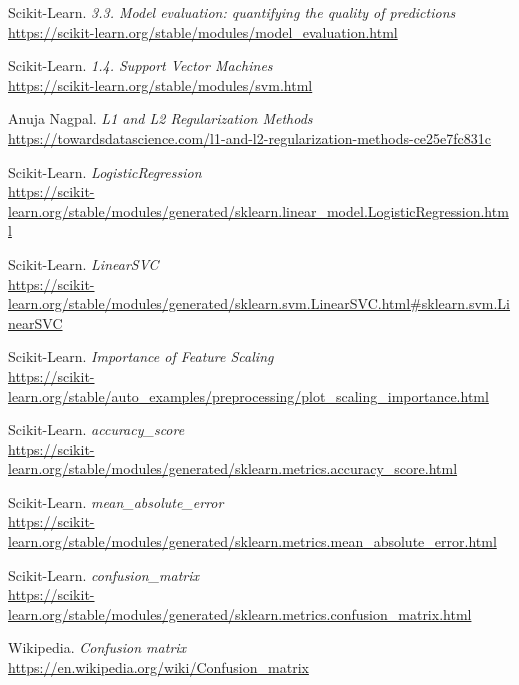 \documentclass[11pt,a4paper]{article}
\begin{document}
\begin{thebibliography}{22}
Scikit-Learn. \textit{3.3. Model evaluation: quantifying the quality of predictions}
\\\url{https://scikit-learn.org/stable/modules/model_evaluation.html}

Scikit-Learn. \textit{1.4. Support Vector Machines}
\\\url{https://scikit-learn.org/stable/modules/svm.html}

Anuja Nagpal. \textit{L1 and L2 Regularization Methods}
\\\url{https://towardsdatascience.com/l1-and-l2-regularization-methods-ce25e7fc831c}

Scikit-Learn. \textit{LogisticRegression}
\\\url{https://scikit-learn.org/stable/modules/generated/sklearn.linear_model.LogisticRegression.html}

Scikit-Learn. \textit{LinearSVC}
\\\url{https://scikit-learn.org/stable/modules/generated/sklearn.svm.LinearSVC.html#sklearn.svm.LinearSVC}

Scikit-Learn. \textit{Importance of Feature Scaling}
\\\url{https://scikit-learn.org/stable/auto_examples/preprocessing/plot_scaling_importance.html}

Scikit-Learn. \textit{accuracy\_score}
\\\url{https://scikit-learn.org/stable/modules/generated/sklearn.metrics.accuracy_score.html}

Scikit-Learn. \textit{mean\_absolute\_error}
\\\url{https://scikit-learn.org/stable/modules/generated/sklearn.metrics.mean_absolute_error.html}

Scikit-Learn. \textit{confusion\_matrix}
\\\url{https://scikit-learn.org/stable/modules/generated/sklearn.metrics.confusion_matrix.html}

Wikipedia. \textit{Confusion matrix}
\\\url{https://en.wikipedia.org/wiki/Confusion_matrix}

\end{thebibliography}
\end{document}
